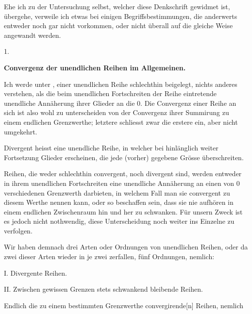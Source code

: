 \clearpage\NoSourceHead{}
\noindent\hspace*{\parindent}Ehe ich zu der Untersuchung selbst, welcher diese Denkschrift gewidmet ist, übergehe, verweile ich etwas bei einigen Begriffsbestimmungen, die anderwerts entweder noch gar nicht vorkommen, oder nicht überall auf die gleiche Weise angewandt werden.
\begin{center}1.\par\smallskip\bfseries Convergenz der unendlichen Reihen im Allgemeinen.\end{center}
\noindent\hspace*{\parindent}Ich werde unter , einer unendlichen Reihe schlechthin beigelegt, nichts anderes verstehen, als die beim unendlichen Fortschreiten der Reihe eintretende unendliche Annäherung ihrer Glieder an die 0. Die Convergenz einer Reihe an sich ist also wohl zu unterscheiden von der Convergenz ihrer Summirung zu einem endlichen Grenzwerthe; letztere schliesst zwar die erstere ein, aber nicht umgekehrt.

Divergent heisst eine unendliche Reihe, in welcher bei hinlänglich weiter Fortsetzung Glieder erscheinen, die jede (vorher) gegebene Grösse überschreiten.

Reihen, die weder schlechthin convergent, noch divergent sind, werden entweder in ihrem unendlichen Fortschreiten eine unendliche Annäherung an einen von 0 verschiedenen Grenzwerth darbieten, in welchem Fall man sie convergent zu diesem Werthe nennen kann, oder so beschaffen sein, dass sie
\clearpage{}
\noindent nie aufhören in einem endlichen Zwischenraum hin und her zu schwanken. Für unsern Zweck ist es jedoch nicht nothwendig, diese Unterscheidung noch weiter ins Einzelne zu verfolgen.

Wir haben demnach drei Arten oder Ordnungen von unendlichen Reihen, oder da zwei dieser Arten wieder in je zwei zerfallen, fünf Ordnungen, nemlich:

I. Divergente Reihen.

II. Zwischen gewissen Grenzen stets schwankend bleibende Reihen.

Endlich die zu einem bestimmten Grenzwerthe convergirende[n] Reihen, nemlich

